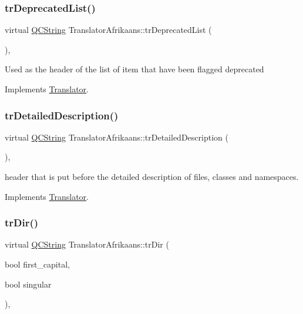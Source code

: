 \subsubsection{\texorpdfstring{trDeprecatedList()}{trDeprecatedList()}}
{\footnotesize\ttfamily virtual \mbox{\hyperlink{class_q_c_string}{Q\+C\+String}} Translator\+Afrikaans\+::tr\+Deprecated\+List (\begin{DoxyParamCaption}{ }\end{DoxyParamCaption})\hspace{0.3cm}{\ttfamily [inline]}, {\ttfamily [virtual]}}

Used as the header of the list of item that have been flagged deprecated 

Implements \mbox{\hyperlink{class_translator}{Translator}}.

\mbox{\label{class_translator_afrikaans_a65d16916cc0b3b8fb7c5548ae7b6c7e5}} 
\subsubsection{\texorpdfstring{trDetailedDescription()}{trDetailedDescription()}}
{\footnotesize\ttfamily virtual \mbox{\hyperlink{class_q_c_string}{Q\+C\+String}} Translator\+Afrikaans\+::tr\+Detailed\+Description (\begin{DoxyParamCaption}{ }\end{DoxyParamCaption})\hspace{0.3cm}{\ttfamily [inline]}, {\ttfamily [virtual]}}

header that is put before the detailed description of files, classes and namespaces. 

Implements \mbox{\hyperlink{class_translator}{Translator}}.

\mbox{\label{class_translator_afrikaans_ac6284be4b1807f6408fe32ac5c372563}} 
\subsubsection{\texorpdfstring{trDir()}{trDir()}}
{\footnotesize\ttfamily virtual \mbox{\hyperlink{class_q_c_string}{Q\+C\+String}} Translator\+Afrikaans\+::tr\+Dir (\begin{DoxyParamCaption}\item[{bool}]{first\+\_\+capital,  }\item[{bool}]{singular }\end{DoxyParamCaption})\hspace{0.3cm}{\ttfamily [inline]}, {\ttfamily [virtual]}}

